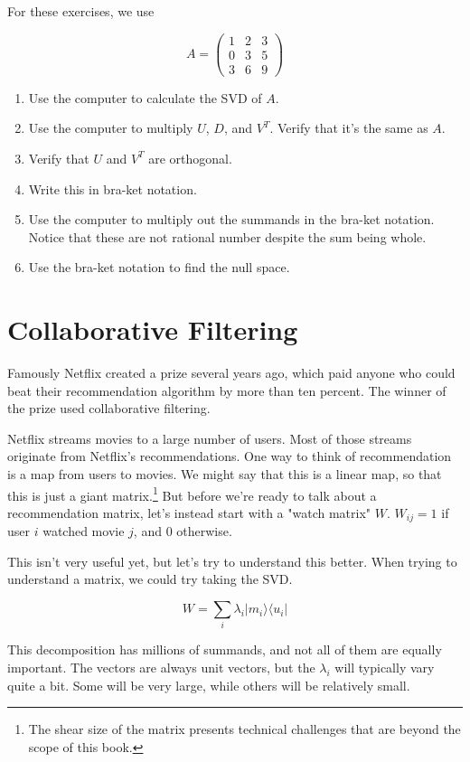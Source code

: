 \documentclass{amsbook}
\begin{document}
For these exercises, we use

$$
A = \left(\begin{array}{ccc} 1 & 2 & 3 \\ 0 & 3 & 5 \\ 3 & 6 & 9 \end{array}\right)
$$

\begin{enumerate}
\item Use the computer to calculate the SVD of $A$.
\item Use the computer to multiply $U$, $D$, and $V^T$.  Verify that it's the same as $A$.
\item Verify that $U$ and $V^T$ are orthogonal.
\item Write this in bra-ket notation.
\item \label{Ex-Irrational Summands} Use the computer to multiply out the summands in the bra-ket notation.  Notice that these are not rational number despite the sum being whole.
\item Use the bra-ket notation to find the null space.
\end{enumerate}

\section{Collaborative Filtering}

Famously Netflix created a prize several years ago, which paid anyone who could beat their recommendation algorithm by more than ten percent.  The winner of the prize used collaborative filtering.

Netflix streams movies to a large number of users.  Most of those streams originate from Netflix's recommendations.  One way to think of recommendation is a map from users to movies.  We might say that this is a linear map, so that this is just a giant matrix.\footnote{The shear size of the matrix presents technical challenges that are beyond the scope of this book.}  But before we're ready to talk about a recommendation matrix, let's instead start with a "watch matrix" $W$.  $W_{ij}=1$ if user $i$ watched movie $j$, and $0$ otherwise.

This isn't very useful yet, but let's try to understand this better.  When trying to understand a matrix, we could try taking the SVD.

$$
W=\sum_i\lambda_i|m_i\rangle\langle u_i|
$$

This decomposition has millions of summands, and not all of them are equally important.  The vectors are always unit vectors, but the $\lambda_i$ will typically vary quite a bit.  Some will be very large, while others will be relatively small.
\end{document}

